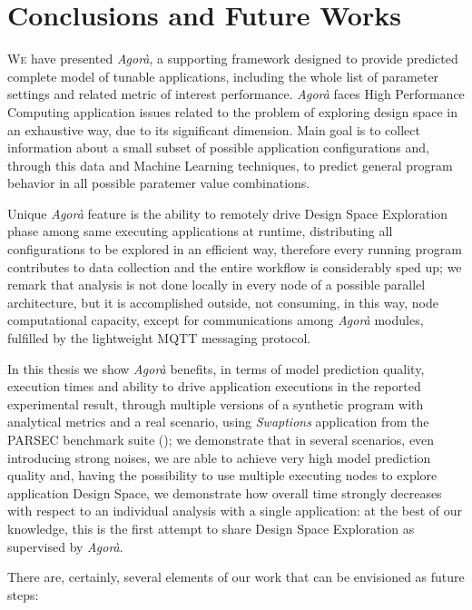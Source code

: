 \chapter{Conclusions and Future Works}\label{end}

\lettrine{W}{e} have presented \textit{Agorà}, a supporting framework designed to provide predicted complete model of tunable applications, including the whole list of parameter settings and related metric of interest performance. \textit{Agorà} faces High Performance Computing application issues related to the problem of exploring design space in an exhaustive way, due to its significant dimension. Main goal is to collect information about a small subset of possible application configurations and, through this data and Machine Learning techniques, to predict general program behavior in all possible paratemer value combinations.

Unique \textit{Agorà} feature is the ability to remotely drive Design Space Exploration phase among same executing applications at runtime, distributing all configurations to be explored in an efficient way, therefore every running program contributes to data collection and the entire workflow is considerably sped up; we remark that analysis is not done locally in every node of a possible parallel architecture, but it is accomplished outside, not consuming, in this way, node computational capacity, except for communications among \textit{Agorà} modules, fulfilled by the lightweight MQTT messaging protocol.

In this thesis we show \textit{Agorà} benefits, in terms of model prediction quality, execution times and ability to drive application executions in the reported experimental result, through multiple versions of a synthetic program with analytical metrics and a real scenario, using \textit{Swaptions} application from the PARSEC benchmark suite (\cite{bienia2008parsec}); we demonstrate that in several scenarios, even introducing strong noises, we are able to achieve very high model prediction quality and, having the possibility to use multiple executing nodes to explore application Design Space, we demonstrate how overall time strongly decreases with respect to an individual analysis with a single application: at the best of our knowledge, this is the first attempt to share Design Space Exploration as supervised by \textit{Agorà}.

There are, certainly, several elements of our work that can be envisioned as future steps:

